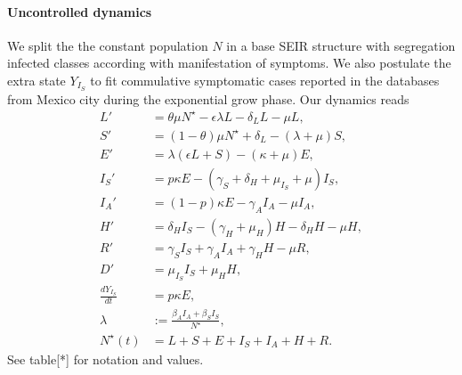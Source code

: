 \documentclass[a4paper,10pt]{amsart}
\begin{document}
        \paragraph{Uncontrolled dynamics}
        We split the the constant population $N$ in a base SEIR 
        structure
        with segregation infected classes according with 
        manifestation  of symptoms.
        We also postulate the extra state $Y_{I_S}$ to fit commulative 
        symptomatic cases reported in the databases from Mexico city
       	during the exponential grow phase. Our dynamics reads
        \begin{equation}
        	\label{eqn:base_dynamics}
            \begin{aligned}
            	L' & = \theta \mu N^{\star}
                	-\epsilon \lambda L - \delta_L L - \mu L,
            	\\
            	S' & =
                	(1 - \theta)\mu N^\star + \delta_L   
                	- (\lambda + \mu) S,
            	\\
            	E' & =
                	\lambda (\epsilon L + S) - (\kappa + \mu) E,
            	\\
            	I_S' & =
                	p \kappa E - (\gamma_S + \delta_H + \mu_{I_S} + \mu) I_S,    
            	\\
            	I_A' &=
                	(1 - p) \kappa E - \gamma_A I_A - \mu I_A,
            	\\
            	H' &=
                	\delta_H I_S - (\gamma_H + \mu_H) H - \delta_H H - \mu H,
            	\\
            	R' & =
                	\gamma_S I_S + \gamma_A I_A + \gamma_H H - \mu R,
            	\\
            	D' &=
                	\mu_{I_S} I_S + \mu_H H,
            	\\
            	\frac{dY_{I_S}}{dt} &  = p \kappa E, 
            	\\
            	\lambda &:=
                	\frac{\beta_A I_A + \beta_S I_S}{N^{\star}},
            	\\
            	N^{\star}(t) &=
                	L + S + E + 
               	 	I_S + I_A +
                	H + R .
            \end{aligned}
        \end{equation}
         See table[*] for notation and values.
\end{document}
